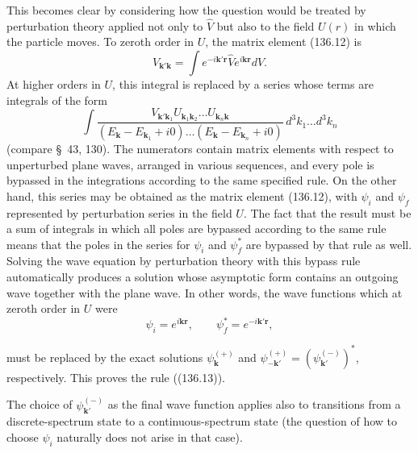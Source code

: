 This becomes clear by considering how the question would be treated by
perturbation theory applied not only to $\hat V$ but also to the field $U(r)$
in which the particle moves. To zeroth order in $U$, the matrix element
(136.12) is
\[
 V_{\mathbf k'\mathbf k}=\int e^{-i\mathbf{k'r}}\hat V e^{i\mathbf{kr}}dV.
\]
At higher orders in $U$, this integral is replaced by a series whose terms are
integrals of the form
\[
 \int\frac{V_{\mathbf k'\mathbf k_1}U_{\mathbf k_1\mathbf k_2}\ldots U_{\mathbf k_n\mathbf k}}
 {(E_{\mathbf k}-E_{\mathbf k_1}+i0)\ldots(E_{\mathbf k}-E_{\mathbf k_n}+i0)}
 \,d^3k_1\ldots d^3k_n
\]
(compare \S~43, 130). The numerators contain matrix elements with respect to
unperturbed plane waves, arranged in various sequences, and every pole is
bypassed in the integrations according to the same specified rule. On the
other hand, this series may be obtained as the matrix element (136.12), with
$\psi_i$ and $\psi_f$ represented by perturbation series in the field $U$.
The fact that the result must be a sum of integrals in which all poles are
bypassed according to the same rule means that the poles in the series for
$\psi_i$ and $\psi_f^*$ are bypassed by that rule as well. Solving the wave
equation by perturbation theory with this bypass rule automatically produces
a solution whose asymptotic form contains an outgoing wave together with the
plane wave. In other words, the wave functions which at zeroth order in $U$
were
\[
 \psi_i=e^{i\mathbf{kr}},\qquad\psi_f^*=e^{-i\mathbf{k'r}},
\]

must be replaced by the exact solutions $\psi_{\mathbf k}^{(+)}$ and
$\psi_{-\mathbf k'}^{(+)}=(\psi_{\mathbf k'}^{(-)})^*$, respectively. This
proves the rule ((136.13)).

The choice of $\psi_{\mathbf k'}^{(-)}$ as the final wave function applies
also to transitions from a discrete-spectrum state to a continuous-spectrum
state (the question of how to choose $\psi_i$ naturally does not arise in
that case).
